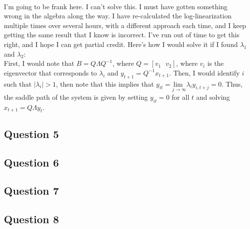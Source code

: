 \documentclass{article}
\begin{document}
\medskip \\ 
I'm going to be frank here. I can't solve this. I must have gotten something wrong in the algebra along the way. I have re-calculated the log-linearization multiple times over several hours, with a different approach each time, and I keep getting the same result that I know is incorrect. I've run out of time to get this right, and I hope I can get partial credit. Here's how I would solve it if I found $\lambda_1$ and $\lambda_2$:
\medskip \\
First, I would note that $B=Q\Lambda Q^{-1}$, where $Q=[v_1\text{ }v_2]$, where $v_i$ is the eigenvector that corresponds to $\lambda_i$ and ${y_{t+1} = Q^{-1}x_{t+1}}$. Then, I would identify $i$ such that $|\lambda_i|>1$, then note that this implies that ${y_{it} = \underset{j\rightarrow\infty}{\text{lim }}\lambda_iy_{i,t+j}=0}$. Thus, the saddle path of the system is given by setting $y_{it} = 0$ for all $t$ and solving ${x_{t+1} = Q\Lambda y_t}$.


\subsection*{Question 5}



\subsection*{Question 6}



\subsection*{Question 7}



\subsection*{Question 8}


\end{document}
